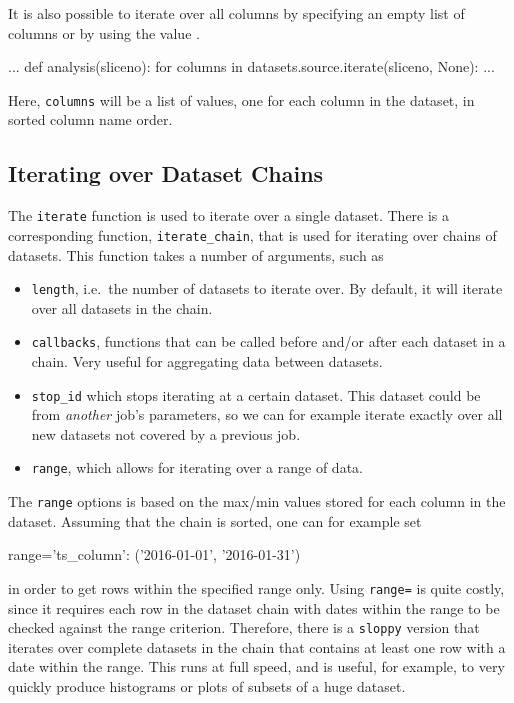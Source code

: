 It is also possible to iterate over all columns by specifying an empty
list of columns or by using the value \pyNone.
\begin{python}
...
def analysis(sliceno):
    for columns in datasets.source.iterate(sliceno, None):
        ...
\end{python}
Here, \texttt{columns} will be a list of values, one for each column
in the dataset, in sorted column name order.


\subsection{Iterating over Dataset Chains}

The \texttt{iterate} function is used to iterate over a single
dataset.  There is a corresponding function, \texttt{iterate\_chain},
that is used for iterating over chains of datasets.  This function
takes a number of arguments, such as
\begin{itemize}
\item[] \texttt{length}, i.e.\ the number of datasets to iterate over.
  By default, it will iterate over all datasets in the chain.
\item[] \texttt{callbacks}, functions that can be called before and/or
  after each dataset in a chain.  Very useful for aggregating data
  between datasets.
\item[] \texttt{stop\_id} which stops iterating at a certain dataset.
  This dataset could be from \textsl{another} job's parameters, so we
  can for example iterate exactly over all new datasets not covered by
  a previous job.
\item[] \texttt{range}, which allows for iterating over a range of
  data.
\end{itemize}
The \texttt{range} options is based on the max/min values stored for
each column in the dataset.  Assuming that the chain is sorted, one
can for example set
\begin{python}
range={'ts_column': ('2016-01-01', '2016-01-31')}
\end{python}
in order to get rows within the specified range only.  Using
\texttt{range=} is quite costly, since it requires each row in the
dataset chain with dates within the range to be checked against the
range criterion.  Therefore, there is a \texttt{sloppy} version that
iterates over complete datasets in the chain that contains at least
one row with a date within the range.  This runs at full speed, and is
useful, for example, to very quickly produce histograms or plots of
subsets of a huge dataset.



